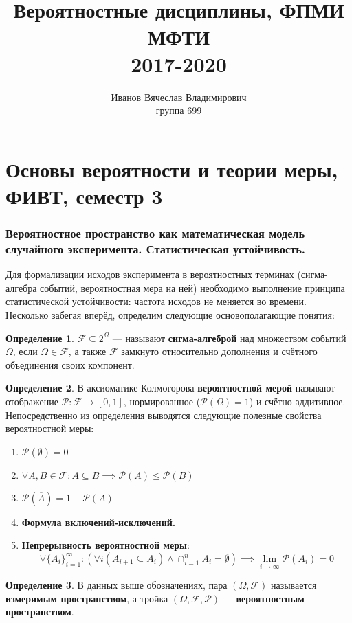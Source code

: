 \documentclass[11pt,a4paper]{report}
\title{\textbf{Вероятностные дисциплины, ФПМИ МФТИ\\2017-2020}}
\author{Иванов Вячеслав Владимирович\\группа 699}
\date{}
\def\salg{\mathcal{F}}
\def\prob{\mathcal{P}}
\theoremstyle{definition}
\theoremstyle{definition}
\theoremstyle{definition}
\newtheorem{definition}{Определение}[section]
\begin{document}
  \setlength{\parindent}{1cm}
  \maketitle
  \tableofcontents
  \newpage
  \part{Основы вероятности и теории меры, ФИВТ, семестр 3}
  \section{Вероятностное пространство как математическая модель случайного эксперимента. Статистическая устойчивость.}
	  Для формализации исходов эксперимента в вероятностных терминах (сигма-алгебра событий, вероятностная мера на ней) необходимо выполнение принципа статистической устойчивости: частота исходов не меняется во времени.\\
	  Несколько забегая вперёд, определим следующие основополагающие понятия:
	  \begin{definition}
	  	$ \mathcal{F} \subseteq 2^{\Omega} $ — называют \textbf{сигма-алгеброй} над множеством событий $ \Omega $, если $ \Omega \in \mathcal{F} $, а также $ \mathcal{F} $ замкнуто относительно дополнения и счётного объединения своих компонент. 
	  \end{definition}
	  \begin{definition}
	  	В аксиоматике Колмогорова \textbf{вероятностной мерой} называют отображение $ \mathcal{P}: \mathcal{F} \to [0, 1] $, нормированное ($ \prob(\Omega) = 1 $) и счётно-аддитивное.\\
	  	Непосредственно из определения выводятся следующие полезные свойства вероятностной меры:
	  	\begin{enumerate}
	  		\item $ \prob(\emptyset) = 0 $
	  		\item $ \forall A, B \in \salg: A \subseteq B \implies \prob(A) \le \prob(B) $
	  		\item $ \prob\left (\overline{A}\right ) =  1 - \prob(A) $ 
	  		\item \textbf{Формула включений-исключений.}
	  		\item \textbf{Непрерывность вероятностной меры}: \[ \forall \{A_{i}\}_{i=1}^{\infty}: (\forall i (A_{i+1} \subseteq A_{i}) \land  \cap_{i=1}^{n}{A_{i}} = \emptyset) \implies \lim_{i\to\infty}{\prob(A_{i})} = 0 \]
	  	\end{enumerate}
	  \end{definition}
	  \begin{definition}
	  	В данных выше обозначениях, пара $ (\Omega, \salg) $ называется \textbf{измеримым пространством}, а тройка $ (\Omega, \salg, \prob) $ — \textbf{вероятностным пространством}.
	  \end{definition}
\end{document}

